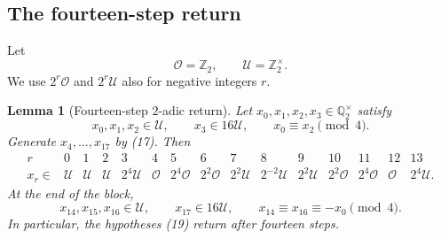 \documentclass[11pt]{article}
\newtheorem{lemma}[theorem]{Lemma}
\theoremstyle{remark}
\newcommand{\Q}{\mathbb Q}
\newcommand{\Ztwo}{\mathbb Z_2}
\newcommand{\Ot}{\mathcal O}
\newcommand{\Ut}{\mathcal U}
\begin{document}
\subsection{The fourteen-step return}

Let
\[
 \Ot=\Ztwo,
 \qquad
 \Ut=\Ztwo^\times.
\]
We use $2^r\Ot$ and $2^r\Ut$ also for negative integers $r$.

\begin{lemma}[Fourteen-step $2$-adic return]\label{lem:return14}
Let $x_0,x_1,x_2,x_3\in\Q_2^\times$ satisfy
\[
 x_0,x_1,x_2\in\Ut,
 \qquad x_3\in16\Ut,
 \qquad x_0\equiv x_2\pmod4.                                  \tag{19}
\]
Generate $x_4,\ldots,x_{17}$ by (17).  Then
\[
\begin{array}{c|cccccccccccccc}
r&0&1&2&3&4&5&6&7&8&9&10&11&12&13\\ \hline
x_r\in
&\Ut&\Ut&\Ut&2^4\Ut
&\Ot&2^4\Ot&2^2\Ot&2^2\Ut&2^{-2}\Ut&2^2\Ut
&2^2\Ot&2^4\Ot&\Ot&2^4\Ut.
\end{array}                                                       \tag{20}
\]
At the end of the block,
\[
 x_{14},x_{15},x_{16}\in\Ut,
 \qquad x_{17}\in16\Ut,
 \qquad x_{14}\equiv x_{16}\equiv-x_0\pmod4.                  \tag{21}
\]
In particular, the hypotheses (19) return after fourteen steps.
\end{lemma}
\end{document}
